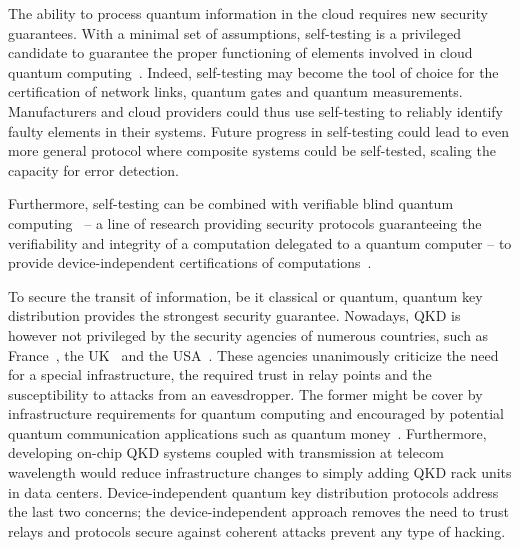 \medbreak

The ability to process quantum information in the cloud requires new security guarantees.
With a minimal set of assumptions, self-testing is a privileged candidate to guarantee the proper functioning of elements involved in cloud quantum computing~\cite{Sekatski2018}.
Indeed, self-testing may become the tool of choice for the certification of network links, quantum gates and quantum measurements.
Manufacturers and cloud providers could thus use self-testing to reliably identify faulty elements in their systems.
Future progress in self-testing could lead to even more general protocol where composite systems could be self-tested, scaling the capacity for error detection.

Furthermore, self-testing can be combined with verifiable blind quantum computing~\cite{Fitzsimons2017,Eisert2020} -- a line of research providing security protocols guaranteeing the verifiability and integrity of a computation delegated to a quantum computer -- to provide device-independent certifications of computations~\cite{Gheorghiu2015,Hajdusek2015}.

\medbreak

To secure the transit of information, be it classical or quantum, quantum key distribution provides the strongest security guarantee.
Nowadays, QKD is however not privileged by the security agencies of numerous countries, such as France~\cite{ANSSI2020}, the UK~\cite{NCSC2020} and the USA~\cite{NSA2020}.
These agencies unanimously criticize the need for a special infrastructure, the required trust in relay points and the susceptibility to attacks from an eavesdropper.
The former might be cover by infrastructure requirements for quantum computing and encouraged by potential quantum communication applications such as quantum money~\cite{Wiesner1983,Molina2013}.
Furthermore, developing on-chip QKD systems coupled with transmission at telecom wavelength would reduce infrastructure changes to simply adding QKD rack units in data centers. 
Device-independent quantum key distribution protocols address the last two concerns; the device-independent approach removes the need to trust relays and protocols secure against coherent attacks prevent any type of hacking.
